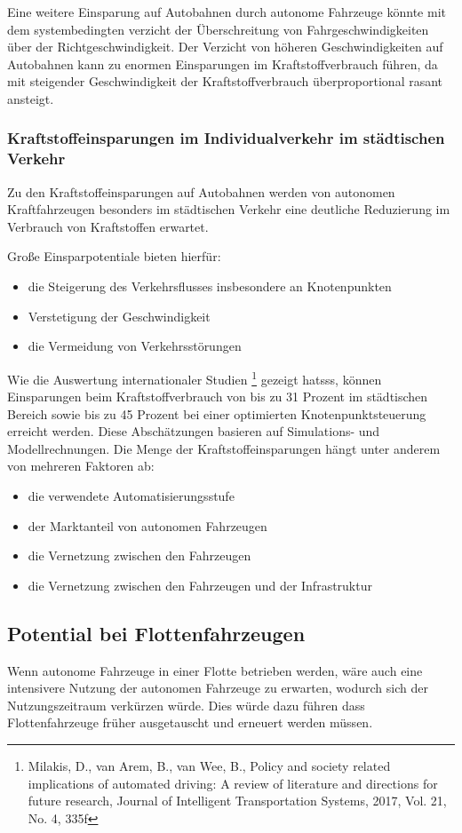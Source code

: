 Eine weitere Einsparung auf Autobahnen durch autonome Fahrzeuge könnte mit
dem systembedingten verzicht der Überschreitung von Fahrgeschwindigkeiten über der Richtgeschwindigkeit.
Der Verzicht von höheren Geschwindigkeiten auf Autobahnen kann zu enormen Einsparungen im Kraftstoffverbrauch führen,
da mit steigender Geschwindigkeit der Kraftstoffverbrauch überproportional rasant ansteigt.

\subsubsection{Kraftstoffeinsparungen im Individualverkehr im städtischen Verkehr}
Zu den Kraftstoffeinsparungen auf Autobahnen werden von
autonomen Kraftfahrzeugen besonders im städtischen Verkehr
eine deutliche Reduzierung im Verbrauch von Kraftstoffen erwartet.

Große Einsparpotentiale bieten hierfür:
\begin{itemize}
	\item die Steigerung des Verkehrsflusses insbesondere an Knotenpunkten
	\item Verstetigung der Geschwindigkeit
	\item die Vermeidung von Verkehrsstörungen
\end{itemize}

Wie die Auswertung internationaler Studien
\footnote{Milakis, D., van Arem, B., van Wee, B., Policy and society related implications of
	automated driving: A review of literature and directions for future research, Journal of
	Intelligent Transportation Systems, 2017, Vol. 21, No. 4, 335f} gezeigt hatsss,
können Einsparungen beim Kraftstoffverbrauch von
bis zu 31 Prozent im städtischen Bereich sowie
bis zu 45 Prozent bei einer optimierten Knotenpunktsteuerung erreicht werden.
Diese Abschätzungen basieren auf Simulations- und Modellrechnungen.
Die Menge der  Kraftstoffeinsparungen hängt unter anderem von mehreren Faktoren ab:
\begin{itemize}
	\item die verwendete Automatisierungsstufe
	\item der Marktanteil von autonomen Fahrzeugen
	\item die Vernetzung zwischen den Fahrzeugen
	\item die Vernetzung zwischen den Fahrzeugen und der Infrastruktur
\end{itemize}

\subsection{Potential bei Flottenfahrzeugen}
Wenn autonome Fahrzeuge in einer Flotte betrieben werden, wäre auch eine intensivere Nutzung der autonomen Fahrzeuge zu erwarten,
wodurch sich der Nutzungszeitraum verkürzen würde.
Dies würde dazu führen dass Flottenfahrzeuge früher ausgetauscht und erneuert werden müssen.

